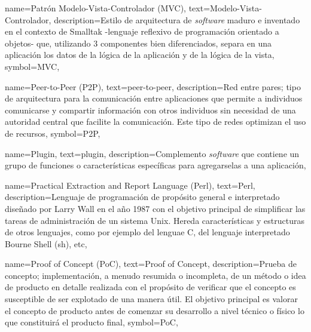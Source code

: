 {
    name={Patrón Modelo-Vista-Controlador (MVC)},
    text={Modelo-Vista-Controlador},
    description={Estilo de arquitectura de \textit{software} maduro e inventado en el contexto de Smalltak -lenguaje reflexivo de programación orientado a objetos- que, utilizando 3 componentes bien diferenciados, separa en una aplicación los datos de la lógica de la aplicación y de la lógica de la vista},
    symbol={MVC},
}

{
    name={Peer-to-Peer (P2P)},
    text={peer-to-peer},
    description={Red entre pares; tipo de arquitectura para la comunicación entre aplicaciones que permite a individuos comunicarse y compartir información con otros individuos sin necesidad de una autoridad central que facilite la comunicación. Este tipo de redes optimizan el uso de recursos},
    symbol={P2P},
}

{
    name={Plugin},
    text={plugin},
    description={Complemento \textit{software} que contiene un grupo de funciones o características específicas para agregarselas a una aplicación},
}

{
    name={Practical Extraction and Report Language (Perl)},
    text={Perl},
    description={Lenguaje de programación de propósito general e interpretado diseñado por Larry Wall en el año 1987 con el objetivo principal de simplificar las tareas de administración de un sistema Unix. Hereda características y estructuras de otros lenguajes, como por ejemplo del lenguae C, del lenguaje interpretado Bourne Shell (sh), etc},
}

{
    name={Proof of Concept (PoC)},
    text={Proof of Concept},
    description={Prueba de concepto; implementación, a menudo resumida o incompleta, de un método o idea de producto en detalle realizada con el propósito de verificar que el concepto es susceptible de ser explotado de una manera útil. El objetivo principal es valorar el concepto de producto antes de comenzar su desarrollo a nivel técnico o físico lo que constituirá el producto final},
    symbol={PoC},
}
	
